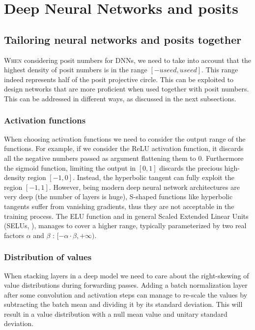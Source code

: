 
\chapter{Deep Neural Networks and posits}\label{chap:posit_networks}
\section{Tailoring neural networks and posits together}

\lettrine{W}{hen} considering posit numbers for DNNs, we need to take into account that the highest density of posit numbers is in the range $[-useed,useed]$. This range indeed represents half of the posit projective circle. This can be exploited to design networks that are more proficient when used together with posit numbers. This can be addressed in different ways, as discussed in the next subsections.

\subsection{Activation functions} When choosing activation functions we need to consider the output range of the functions. For example, if we consider the ReLU activation function, it discards all the negative numbers passed as argument flattening them to $0$. Furthermore the sigmoid function, limiting the output in $[0,1]$ discards the precious high-density region $[-1,0]$. Instead, the hyperbolic tangent can fully exploit the region $[-1,1]$. However, being modern deep neural network architectures are very deep (the number of layers is huge), S-shaped functions like hyperbolic tangents suffer from vanishing gradients, thus they are not acceptable in the training process. The ELU function and in general Scaled Extended Linear Units (SELUs, \cite{NIPS2017_6698}), manages to cover a higher range, typically parameterized by two real factors $\alpha$ and $\beta$ : $[-\alpha \cdot \beta,+\infty)$.

\subsection{Distribution of values} When stacking layers in a deep model we need to care about the right-skewing of value distributions during forwarding passes. Adding a batch normalization layer \cite{Ioffe:2015:BNA:3045118.3045167} after some convolution and activation steps can manage to re-scale the values by subtracting the batch mean and dividing it by its standard deviation. This will result in a value distribution with a null mean value and unitary standard deviation. 

